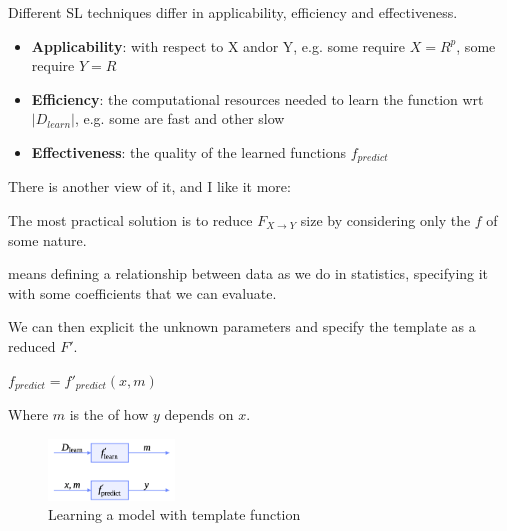 Different SL techniques differ in applicability, efficiency and effectiveness.
\begin{itemize}
    \item \textbf{Applicability}: with respect to X and\/or Y, e.g. some require $X = R^{p}$, some require $Y = R$
    \item \textbf{Efficiency}: the computational resources needed to learn the function wrt $|D_{learn}|$, e.g. some are fast and other slow
    \item \textbf{Effectiveness}: the quality of the learned functions $f_{predict}$
\end{itemize}

There is another view of it, and I like it more:

The most practical solution is to reduce $F_{X \to Y}$ size by considering only the $f$ of some nature.

 means defining a relationship between data as we do in statistics, specifying it with some coefficients that we can evaluate.

We can then explicit the unknown parameters and specify the template as a reduced $F'$. 
\begin{center}
    $f_{predict} = f'_{predict}(x,m)$
\end{center}

Where $m$ is the  of how $y$ depends on $x$.

\begin{figure}[H]
    \centering
    \includegraphics[width=0.3\textwidth]{assets/fig2.png}
    \caption{Learning a model with template function}
    \label{fig:template}
\end{figure}


